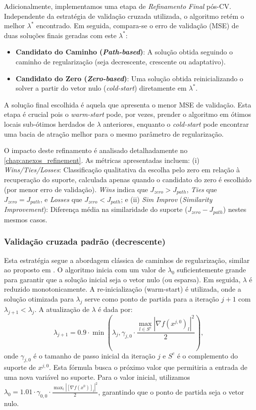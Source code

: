 Adicionalmente, implementamos uma etapa de \textit{Refinamento Final} pós-CV. Independente da estratégia de validação cruzada utilizada, o algoritmo retém o melhor $\lambda^*$ encontrado. Em seguida, compara-se o erro de validação (MSE) de duas soluções finais geradas com este $\lambda^*$:
\begin{itemize}
    \item \textbf{Candidato do Caminho (\textit{Path-based})}: A solução obtida seguindo o caminho de regularização (seja decrescente, crescente ou adaptativo).
    \item \textbf{Candidato do Zero (\textit{Zero-based})}: Uma solução obtida reinicializando o solver a partir do vetor nulo (\textit{cold-start}) diretamente em $\lambda^*$.
\end{itemize}
A solução final escolhida é aquela que apresenta o menor MSE de validação. Esta etapa é crucial pois o \textit{warm-start} pode, por vezes, prender o algoritmo em ótimos locais sub-ótimos herdados de $\lambda$ anteriores, enquanto o \textit{cold-start} pode encontrar uma bacia de atração melhor para o mesmo parâmetro de regularização.

O impacto deste refinamento é analisado detalhadamente no \autoref{chap:anexos_refinement}. As métricas apresentadas incluem: (i) \textit{Wins/Ties/Losses}: Classificação qualitativa da escolha pelo zero em relação à recuperação do suporte, calculada apenas quando o candidato do zero é escolhido (por menor erro de validação). \textit{Wins} indica que $J_{zero} > J_{path}$, \textit{Ties} que $J_{zero} = J_{path}$, e \textit{Losses} que $J_{zero} < J_{path}$; e (ii) \textit{Sim Improv} (\textit{Similarity Improvement}): Diferença média na similaridade do suporte ($J_{zero} - J_{path}$) nestes mesmos casos.

\subsubsection{Validação cruzada padrão (decrescente)}
Esta estratégia segue a abordagem clássica de caminhos de regularização, similar ao proposto em \cite{fastselect}. O algoritmo inicia com um valor de $\lambda_0$ suficientemente grande para garantir que a solução inicial seja o vetor nulo (ou esparsa). Em seguida, $\lambda$ é reduzido monotonicamente. A re-inicialização (warm-start) é utilizada, onde a solução otimizada para $\lambda_j$ serve como ponto de partida para a iteração $j+1$ com $\lambda_{j+1} < \lambda_j$.
A atualização de $\lambda$ é dada por:
\[
\lambda_{j+1} = 0.9 \cdot \min\left(\lambda_j, \gamma_{j,0} \cdot \frac{\max_{l \in S^c} |\nabla f(x^{j,0})_l|^2}{2}\right),
\]
onde $\gamma_{j,0}$ é o tamanho de passo inicial da iteração $j$ e $S^c$ é o complemento do suporte de $x^{j,0}$. Esta fórmula busca o próximo valor que permitiria a entrada de uma nova variável no suporte. Para o valor inicial, utilizamos $\lambda_0 = 1.01 \cdot \gamma_{0,0} \cdot \frac{\max_l |[\nabla f(x^0)]_l|^2}{2}$, garantindo que o ponto de partida seja o vetor nulo.

